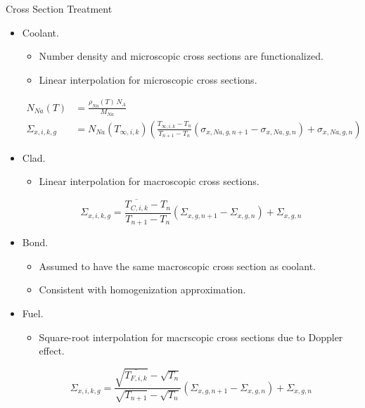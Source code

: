 \begin{frame}{Cross Section Treatment}
  \begin{itemize}
    \item Coolant. 
      \begin{itemize}
        \item Number density and microscopic cross sections are functionalized.
        \item Linear interpolation for microscopic cross sections.
      \end{itemize}
      \begin{align}
        N_{Na}(T) &= \frac{\rho_{Na}(T) \, N_A}{M_{Na}}\\
        \label{eq:xs_cool}
        \Sigma_{x,i,k,g} &= N_{Na}(T_{\infty,i,k}) 
          \left( \frac{T_{\infty,i,k} - T_{n}}{T_{n+1}-T_{n}} 
          (\sigma_{x,Na,g,n+1} - \sigma_{x,Na,g,n})  + \sigma_{x,Na,g,n}\right)
      \end{align}
    \vspace{-\baselineskip}
    \item Clad. 
      \begin{itemize}
        \item Linear interpolation for macroscopic cross sections.
      \end{itemize}
      \begin{equation}
        \label{eq:xs_linear_interpolation}
        \Sigma_{x,i,k,g} = 
          \frac{\overline{T_{C,i,k}} - T_{n}}{T_{n+1}-T_{n}} 
          (\Sigma_{x,g,n+1} - \Sigma_{x,g,n})  + \Sigma_{x,g,n}
      \end{equation}
    \vspace{-2\baselineskip}
    \item Bond.
      \begin{itemize}
        \item Assumed to have the same macroscopic cross section as coolant.
        \item Consistent with homogenization approximation.
      \end{itemize}
    \item Fuel.
      \begin{itemize}
        \item Square-root interpolation for macrscopic cross sections due to 
          Doppler effect. 
      \end{itemize}
      \begin{equation}
        \Sigma_{x,i,k,g} = 
          \frac{\sqrt{\overline{T_{F,i,k}}} - \sqrt{T_{n}}}
          {\sqrt{T_{n+1}}-\sqrt{T_{n}}}
          (\Sigma_{x,g,n+1} - \Sigma_{x,g,n})  + \Sigma_{x,g,n}
      \end{equation}
  \end{itemize}
\end{frame}


